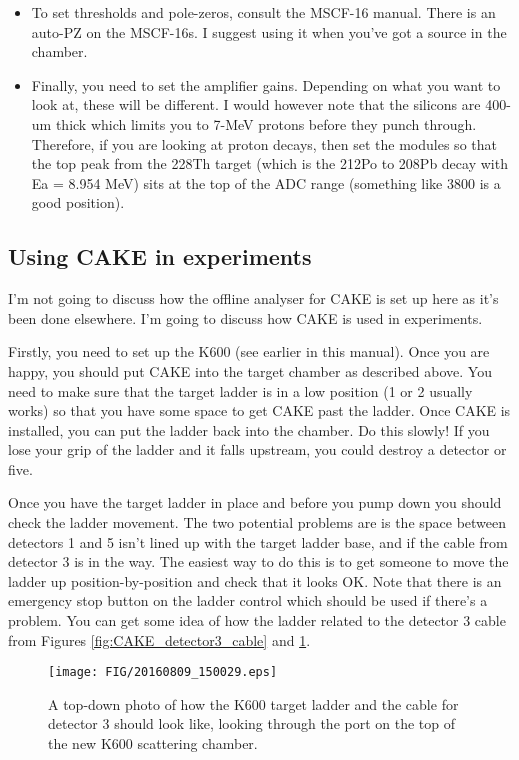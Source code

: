 \documentclass[11pt]{report}
\begin{document}
\begin{itemize}
\item To set thresholds and pole-zeros, consult the MSCF-16 manual. There is an auto-PZ on the MSCF-16s. I suggest using it when you've got a source in the chamber.

\item Finally, you need to set the amplifier gains. Depending on what you want to look at, these will be different. I would however note that the silicons are 400-um thick which limits you to 7-MeV protons before they punch through. Therefore, if you are looking at proton decays, then set the modules so that the top peak from the 228Th target (which is the 212Po to 208Pb decay with Ea = 8.954 MeV) sits at the top of the ADC range (something like 3800 is a good position).

\end{itemize}

\subsection{Using CAKE in experiments}

I'm not going to discuss how the offline analyser for CAKE is set up here as it's been done elsewhere. I'm going to discuss how CAKE is used in experiments.

Firstly, you need to set up the K600 (see earlier in this manual). Once you are happy, you should put CAKE into the target chamber as described above. You need to make sure that the target ladder is in a low position (1 or 2 usually works) so that you have some space to get CAKE past the ladder. Once CAKE is installed, you can put the ladder back into the chamber. Do this slowly! If you lose your grip of the ladder and it falls upstream, you could destroy a detector or five.

Once you have the target ladder in place and before you pump down you should check the ladder movement. The two potential problems are is the space between detectors 1 and 5 isn't lined up with the target ladder base, and if the cable from detector 3 is in the way. The easiest way to do this is to get someone to move the ladder up position-by-position and check that it looks OK. Note that there is an emergency stop button on the ladder control which should be used if there's a problem. You can get some idea of how the ladder related to the detector 3 cable from Figures \ref{fig:CAKE_detector3_cable} and \ref{fig:CAKE_detector3_cable_from_the_top}.

\begin{figure}
 \texttt{[image: FIG/20160809\_150029.eps]}
 \caption{A top-down photo of how the K600 target ladder and the cable for detector 3 should look like, looking through the port on the top of the new K600 scattering chamber.}
 \label{fig:CAKE_detector3_cable_from_the_top}
\end{figure}
\end{document}
